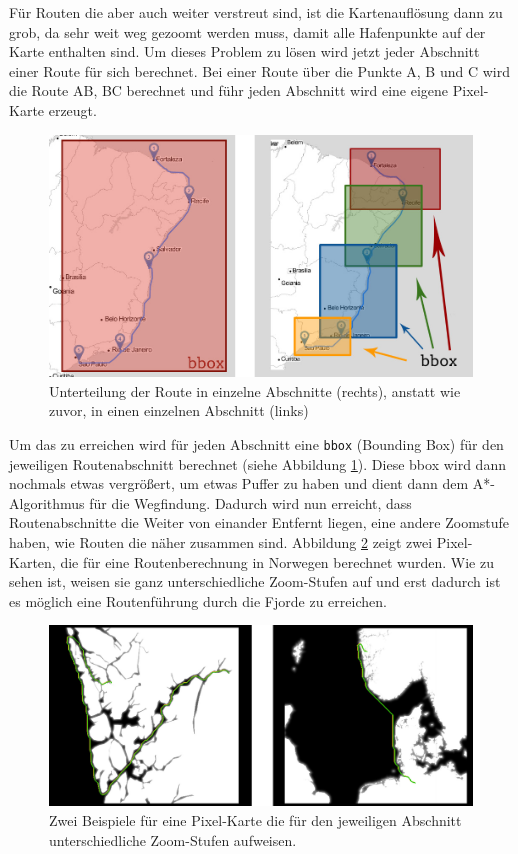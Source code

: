 \documentclass[letterpaper]{article}
\begin{document}
	Für Routen die aber auch weiter verstreut sind, ist die Kartenauflösung dann zu grob, da sehr weit weg gezoomt werden muss, damit alle Hafenpunkte auf der Karte enthalten sind.
	Um dieses Problem zu lösen wird jetzt jeder Abschnitt einer Route für sich berechnet. Bei einer Route über die Punkte A, B und C wird die Route AB, BC berechnet und führ jeden Abschnitt wird eine eigene Pixel-Karte erzeugt.

	\begin{figure}[!htbp]
		\centering
		\includegraphics[width=\linewidth]{bbox_clipping}
		\caption{Unterteilung der Route in einzelne Abschnitte (rechts), anstatt wie zuvor, in einen einzelnen Abschnitt (links)}
		\label{fig:bbox_clipping}
	\end{figure}

	Um das zu erreichen wird für jeden Abschnitt eine \texttt{bbox} (Bounding Box) für den jeweiligen Routenabschnitt berechnet (siehe Abbildung \ref{fig:bbox_clipping}). Diese bbox wird dann nochmals etwas vergrößert, um etwas Puffer zu haben und dient dann dem A*-Algorithmus für die Wegfindung.
	Dadurch wird nun erreicht, dass Routenabschnitte die Weiter von einander Entfernt liegen, eine andere Zoomstufe haben, wie Routen die näher zusammen sind. Abbildung \ref{fig:bbox_clipping_pixelmap} zeigt zwei Pixel-Karten, die für eine Routenberechnung in Norwegen berechnet wurden. Wie zu sehen ist, weisen sie ganz unterschiedliche Zoom-Stufen auf und erst dadurch ist es möglich eine Routenführung durch die Fjorde zu erreichen.

	\begin{figure}[!htbp]
		\centering
		\includegraphics[width=\linewidth]{bbox_clipping_pixelmap}
		\caption{Zwei Beispiele für eine Pixel-Karte die für den jeweiligen Abschnitt unterschiedliche Zoom-Stufen aufweisen.}
		\label{fig:bbox_clipping_pixelmap}
	\end{figure}
\end{document}

